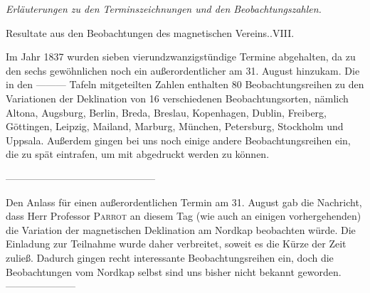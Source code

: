 \begin{center}\large\textit{Erläuterungen zu den Terminszeichnungen und den Beobachtungszahlen.}\par
[\textit{Im Auszug.}]\end{center}
\begin{center}\small Resultate aus den Beobachtungen des magnetischen Vereins..\quad VIII.\end{center}

Im Jahr 1837 wurden sieben vierundzwanzigstündige Termine abgehalten, da zu den sechs gewöhnlichen noch ein außerordentlicher am 31. August hinzukam. Die in den ---\quad---\quad--- Tafeln mitgeteilten Zahlen enthalten 80 Beobachtungsreihen zu den Variationen der Deklination von 16 verschiedenen Beobachtungsorten, nämlich Altona, Augsburg, Berlin, Breda, Breslau, Kopenhagen, Dublin, Freiberg, Göttingen, Leipzig, Mailand, Marburg, München, Petersburg, Stockholm und Uppsala. Außerdem gingen bei uns noch einige andere Beobachtungsreihen ein, die zu spät eintrafen, um mit abgedruckt werden zu können.
\begin{center}\small
---\enspace---\enspace---\enspace---\enspace---\enspace---\enspace---\enspace---\enspace---\enspace---\enspace---\enspace---\enspace---\enspace---\enspace---
\end{center}
Den Anlass für einen außerordentlichen Termin am 31. August gab die Nachricht, dass Herr Professor \textsc{Parrot} an diesem Tag (wie auch an einigen vorhergehenden) die Variation der magnetischen Deklination am Nordkap beobachten würde. Die Einladung zur Teilnahme wurde daher verbreitet, soweit es die Kürze der Zeit zuließ. Dadurch gingen recht interessante Beobachtungsreihen ein, doch die Beobachtungen vom Nordkap selbst sind uns bisher nicht bekannt geworden. ---\quad---\quad---\quad---\quad---\quad---\quad---


